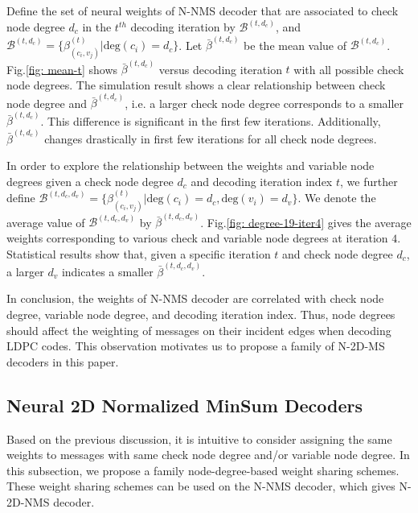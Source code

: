 \documentclass [PhD] {uclathes}
\begin{document}
Define the set of neural weights of N-NMS decoder that are associated to check node degree $d_c$ in the $t^{th}$ decoding iteration by $\mathcal{B}^{(t,d_c)}$, and $\mathcal{B}^{(t,d_c)}=\{\beta^{(t)}_{(c_i,v_j)}|\text{deg}(c_i) = d_c\}$. Let $\bar{\beta}^{(t,d_c)}$ be the mean value of $\mathcal{B}^{(t,d_c)}$. Fig.\ref{fig: mean-t} shows $\bar{\beta}^{(t,d_c)}$ versus decoding iteration $t$ with all possible check node degrees. The simulation result shows a clear relationship between check node degree and $\bar{\beta}^{(t,d_c)}$, i.e. a larger check node degree corresponds to a smaller $\bar{\beta}^{(t,d_c)}$. This difference is significant in the first few iterations.
Additionally, $\bar{\beta}^{(t,d_c)}$ changes drastically in first few iterations for all check node degrees. 

In order to explore the relationship between the weights and variable node degrees given a check node degree $d_c$ and decoding iteration index $t$, we further define $ \mathcal{B}^{(t,d_c,d_v)}=\{\beta^{(t)}_{(c_i,v_j)}\allowbreak| \text{deg}(c_i)=d_c,\text{deg}(v_i)=d_v\}$. We denote  the average value of $\mathcal{B}^{(t,d_c,d_v)}$ by $\bar{\beta}^{(t,d_c,d_v)}$. Fig.\ref{fig: degree-19-iter4} gives the average weights corresponding to various check and variable node degrees at iteration $4$. Statistical results show that, given a specific iteration $t$ and check node degree $d_c$, a larger $d_v$ indicates a smaller $\bar{\beta}^{(t,d_c,d_v)}$. 

In conclusion, the weights of N-NMS decoder are correlated with check node degree, variable node degree, and decoding iteration index. Thus, node degrees should affect the weighting of messages on their incident edges when decoding LDPC codes. This observation motivates us to propose a family of N-2D-MS decoders in this paper. 
\begin{center}
    
\end{center}
\subsection{Neural 2D Normalized MinSum Decoders}
Based on the previous discussion, it is intuitive to consider assigning the same weights to messages with same check node degree and/or variable node degree. 
In this subsection, we propose a family node-degree-based weight sharing schemes.
These weight sharing schemes can be used on the  N-NMS decoder, which gives N-2D-NMS decoder. 
\end{document}

